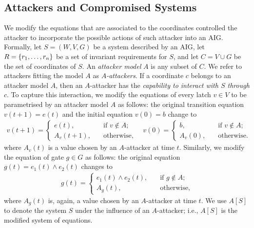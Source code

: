 \subsection{Attackers and Compromised Systems}
We modify the equations that are associated to the coordinates controlled the attacker to incorporate the possible actions of such attacker into an AIG. Formally, let $S=(W,V,G)$ be a system described by an AIG, let $R=\left\{r_1, \ldots, r_n\right\}$ be a set of invariant requirements for $S$, and let $C=V\cup G$ be the set of coordinates of $S$. An \emph{attacker model} $A$ is any subset of $C$. We refer to attackers fitting the model $A$ as \emph{$A$-attackers}. If a coordinate $c$ belongs to an attacker model $A$, then an $A$-attacker has the \emph{capability to interact with $S$ through} $c$. To capture this interaction, we modify the equations of every latch $v\in V$ to be parametrised by an attacker model $A$ as follows: the original transition equation $v(t+1)=e(t)$ and the initial equation $v(0)=b$ change to
\begin{align}
\label{eq:badLatch}
v(t+1) = \begin{cases}
e(t), \quad &\text{if $v\not \in A$;}\\
A_v(t+1), \quad &\text{otherwise},
\end{cases}
\quad 
v(0)= \begin{cases}
b, \quad &\text{if $v \not \in A$;}\\
A_v(0), \quad &\text{otherwise.}
\end{cases}
\end{align}
where $A_v(t)$ is a value chosen by an $A$-attacker at time $t$. Similarly, we modify the equation of gate $g\in G$ as follows: the original equation $g(t)=e_1(t)\land e_2(t)$ changes to
\begin{align}
\label{eq:badGate}
g(t) = \begin{cases}
e_1(t)\land e_2(t), \quad &\text{if $g\not \in A$;}\\
A_g(t), \quad &\text{otherwise},
\end{cases}
\end{align}
where $A_g(t)$ is, again, a value chosen by an $A$-attacker at time $t$. We use $A[S]$ to denote the system $S$ under the influence of an $A$-attacker; i.e., $A[S]$ is the modified system of equations. 

